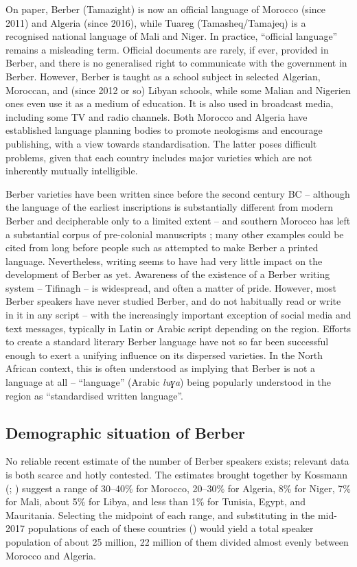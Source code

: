 \documentclass[output=paper]{langsci/langscibook}
\begin{document}
On paper, Berber (Tamazight) is now an official language of Morocco (since 2011) and Algeria (since 2016), while Tuareg (Tamasheq/Tamajeq) is a recognised national language of Mali and Niger. In practice, “official language” remains a misleading term.  Official documents are rarely, if ever, provided in Berber, and there is no generalised right to communicate with the government in Berber.  However, Berber is taught as a school subject in selected Algerian, Moroccan, and (since 2012 or so) Libyan schools, while some Malian and Nigerien ones even use it as a medium of education. It is also used in broadcast media, including some TV and radio channels. Both Morocco and Algeria have established language planning bodies to promote neologisms and encourage publishing, with a view towards standardisation. The latter poses difficult problems, given that each country includes major varieties which are not inherently mutually intelligible.

Berber varieties have been written since before the second century BC \citep{Pichler2007} – although the language of the earliest inscriptions is substantially different from modern Berber and decipherable only to a limited extent – and southern Morocco has left a substantial corpus of pre-colonial manuscripts \citep{Boogert1997}; many other examples could be cited from long before people such as \citet{Mammeri1976} attempted to make Berber a printed language. Nevertheless, writing seems to have had very little impact on the development of Berber as yet. Awareness of the existence of a Berber writing system – Tifinagh – is widespread, and often a matter of pride. However, most Berber speakers have never studied Berber, and do not habitually read or write in it in any script – with the increasingly important exception of social media and text messages, typically in Latin or Arabic script depending on the region. Efforts to create a standard literary Berber language have not so far been successful enough to exert a unifying influence on its dispersed varieties. In the North African context, this is often understood as implying that Berber is not a language at all – “language” (Arabic \textit{luɣa}) being popularly understood in the region as “standardised written language”.
\largerpage
 
 \subsection{Demographic situation of Berber}


No reliable recent estimate of the number of Berber speakers exists; relevant data is both scarce and hotly contested. The estimates brought together by Kossmann (\citeyear[1]{Kossmann2011}; \citeyear[29--36]{Kossmann2013book}) suggest a range of 30–40\% for Morocco, 20–30\% for Algeria, 8\% for Niger, 7\% for Mali, about 5\% for Libya, and less than 1\% for Tunisia, Egypt, and Mauritania.  Selecting the midpoint of each range, and substituting in the mid-2017 populations of each of these countries (\citealt{CIA2017}) would yield a total speaker population of about 25 million, 22 million of them divided almost evenly between Morocco and Algeria.
\end{document}
